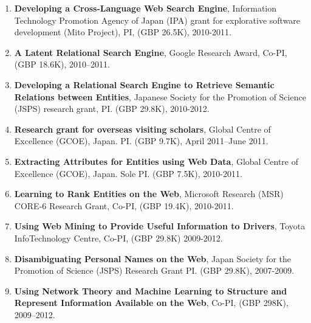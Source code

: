 \documentclass[a4paper,11pt]{article}
\begin{document}
\begin{enumerate}
\item \textbf{Developing a Cross-Language Web Search Engine}, Information Technology Promotion Agency of Japan (IPA) grant for explorative software development (Mito Project), PI, (GBP 26.5K), 2010-2011.

\item \textbf{A Latent Relational Search Engine}, Google Research Award, Co-PI, (GBP 18.6K), 2010–2011.

\item \textbf{Developing a Relational Search Engine to Retrieve Semantic Relations between Entities}, Japanese Society for the Promotion of Science (JSPS) research grant, PI. (GBP 29.8K), 2010-2012.

\item \textbf{Research grant for overseas visiting scholars}, Global Centre of Excellence (GCOE), Japan. PI. (GBP 9.7K), April 2011–June 2011.

\item \textbf{Extracting Attributes for Entities using Web Data}, Global Centre of Excellence (GCOE), Japan. Sole PI. (GBP 7.5K), 2010-2011.

\item \textbf{Learning to Rank Entities on the Web}, Microsoft Research (MSR) CORE-6 Research Grant, Co-PI, (GBP 19.4K), 2010-2011.

\item \textbf{Using Web Mining to Provide Useful Information to Drivers}, Toyota InfoTechnology Centre, Co-PI, (GBP 29.8K) 2009-2012.

\item \textbf{Disambiguating Personal Names on the Web}, Japan Society for the Promotion of Science (JSPS) Research Grant PI. (GBP 29.8K), 2007-2009.

\item \textbf{Using Network Theory and Machine Learning to Structure and Represent Information Available on the Web}, Co-PI, (GBP 298K), 2009–2012.
\end{enumerate}
\end{document}
